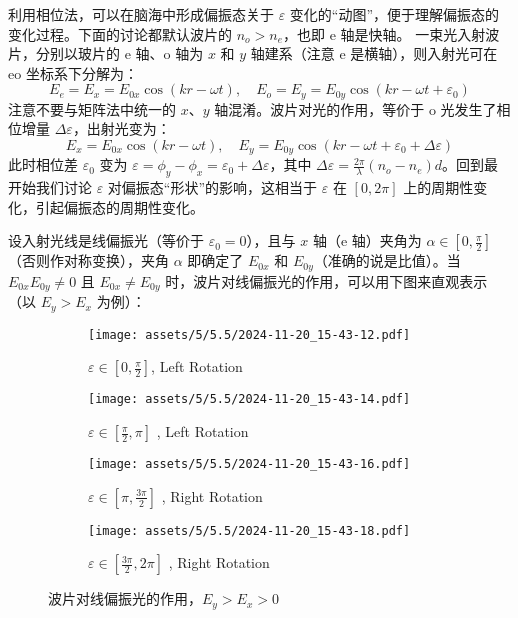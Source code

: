 \documentclass[UTF8]{report}
\theoremstyle{MyLineTheoremStyle} %
\theoremstyle{MyBlockTheoremStyle} %
\theoremstyle{MySubsubsectionStyle} %
\begin{document}
利用相位法，可以在脑海中形成偏振态关于 $\varepsilon$ 变化的“动图”，便于理解偏振态的变化过程。下面的讨论都默认波片的  $n_o > n_e$，也即 e 轴是快轴。
一束光入射波片，分别以玻片的 e 轴、o 轴为 $x$ 和 $y$ 轴建系（注意 e 是横轴），则入射光可在 eo 坐标系下分解为：
\begin{equation}
E_e = E_x = E_{0x}\cos (kr - \omega t),\quad E_o = E_y = E_{0y}\cos (kr - \omega t + \varepsilon_0)
\end{equation}
注意不要与矩阵法中统一的 $x$、$y$ 轴混淆。波片对光的作用，等价于 o 光发生了相位增量 $\Delta \varepsilon$，出射光变为：
\begin{equation}
    E_x = E_{0x}\cos (kr - \omega t ),\quad E_y = E_{0y}\cos (kr - \omega t + \varepsilon_0 + \Delta \varepsilon)
\end{equation}
此时相位差 $\varepsilon_0$ 变为 $\varepsilon = \phi_y - \phi_x = \varepsilon_0 + \Delta \varepsilon$，其中 $\Delta \varepsilon = \frac{2 \pi }{\lambda} (n_o - n_e)d$。回到最开始我们讨论 $\varepsilon$ 对偏振态“形状”的影响，这相当于 $\varepsilon$ 在 $[0, 2\pi]$ 上的周期性变化，引起偏振态的周期性变化。

设入射光线是线偏振光（等价于 $\varepsilon_0 = 0$），且与 $x$ 轴（e 轴）夹角为 $\alpha \in [0, \frac{\pi}{2}]$（否则作对称变换），夹角 $\alpha$ 即确定了 $E_{0x}$ 和 $E_{0y}$（准确的说是比值）。当 $E_{0x}E_{0y} \ne 0$ 且 $E_{0x} \ne E_{0y}$ 时，波片对线偏振光的作用，可以用下图来直观表示（以 $E_y > E_x$ 为例）：

\begin{figure}[H]\centering
\begin{subfigure}[b]{0.24\columnwidth}\centering
    \texttt{[image: assets/5/5.5/2024-11-20\_15-43-12.pdf]}
    \caption{$\varepsilon \in [0, \frac{\pi}{2}]$, Left Rotation}
\end{subfigure}
\begin{subfigure}[b]{0.24\columnwidth}\centering
    \texttt{[image: assets/5/5.5/2024-11-20\_15-43-14.pdf]}
    \caption{$\varepsilon \in [\frac{\pi}{2}, \pi]$ , Left Rotation}
\end{subfigure}
\begin{subfigure}[b]{0.24\columnwidth}\centering
    \texttt{[image: assets/5/5.5/2024-11-20\_15-43-16.pdf]}
    \caption{$\varepsilon \in [\pi, \frac{3\pi}{2}]$ , Right Rotation}
\end{subfigure}
\begin{subfigure}[b]{0.24\columnwidth}\centering
    \texttt{[image: assets/5/5.5/2024-11-20\_15-43-18.pdf]}
    \caption{$\varepsilon \in [\frac{3\pi}{2}, 2\pi]$ , Right Rotation}
\end{subfigure}
\caption{波片对线偏振光的作用，$E_y > E_x > 0$}
\end{figure}
\end{document}
